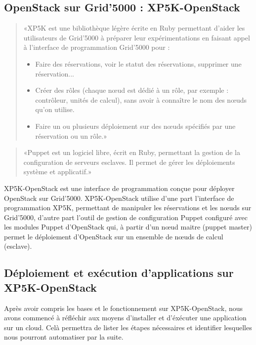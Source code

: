 \documentclass{report}
\begin{document}
		  \subsection{OpenStack sur Grid'5000 : XP5K-OpenStack}

		     \begin{quote}  %
                «XP5K est une bibliothèque légère écrite en Ruby permettant d'aider les utilisateurs de Grid'5000 à préparer leur expérimentations en faisant appel à l'interface de programmation Grid'5000 pour :
                \begin{itemize}
                \item Faire des réservations, voir le statut des réservations, supprimer une réservation...
                \item Créer des rôles (chaque nœud est dédié à un rôle, par exemple : contrôleur, unités de calcul), sans avoir à connaître le nom des nœuds qu'on utilise.
                \item Faire un ou plusieurs déploiement sur des nœuds spécifiés par une réservation ou un rôle.» \cite{XP5K}
                \end{itemize}
            \end{quote}

            \begin{quote}
		       «Puppet est un logiciel libre, écrit en Ruby, permettant la gestion de la configuration de serveurs esclaves. Il permet de gérer les déploiements système et applicatif.»
		       \cite{Puppet}
		    \end{quote}

            XP5K-OpenStack est une interface de programmation conçue pour déployer OpenStack sur Grid'5000.
            XP5K-OpenStack utilise d'une part l'interface de programmation XP5K, permettant de manipuler les réservations et les nœuds sur Grid'5000, d'autre part l'outil de gestion de configuration Puppet configuré avec les modules Puppet d'OpenStack qui, à partir d'un nœud maitre (puppet master) permet le déploiement d'OpenStack sur un ensemble de nœuds de calcul (esclave).

		  \subsection{Déploiement et exécution d'applications sur XP5K-OpenStack}
Après avoir compris les bases et le fonctionnement sur XP5K-OpenStack, nous avons commencé à réfléchir aux moyens d'installer et d'éxécuter une application sur un cloud. Celà permettra de lister les étapes nécessaires et identifier lesquelles nous pourront automatiser par la suite.\bigbreak
\end{document}
